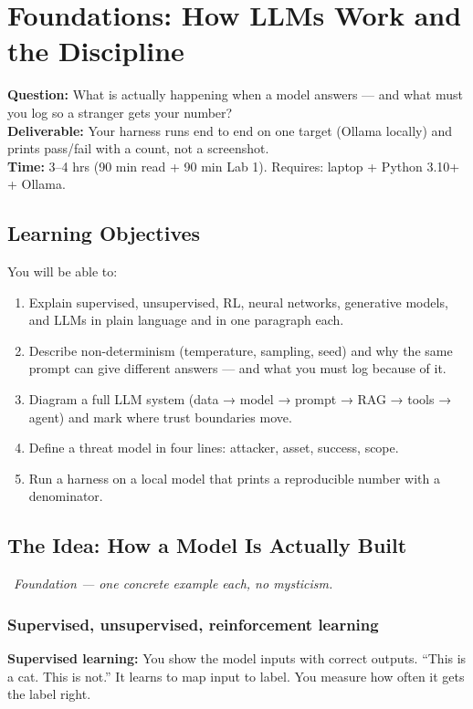 \chapter{Foundations: How LLMs Work and the Discipline}
\label{ch:1}

\begin{tcolorbox}[colback=white,colframe=checkblack,title=Chapter 1 at a Glance,fonttitle=\bfseries,sharp corners,boxrule=1pt]
\textbf{Question:} What is actually happening when a model answers — and what must you log so a stranger gets your number?\\
\textbf{Deliverable:} Your harness runs end to end on one target (Ollama locally) and prints pass/fail with a count, not a screenshot.\\
\textbf{Time:} 3–4 hrs (90 min read + 90 min Lab 1). Requires: laptop + Python 3.10+ + Ollama.
\end{tcolorbox}

\section{Learning Objectives}
\fbadge

You will be able to:
\begin{enumerate}
\item Explain supervised, unsupervised, RL, neural networks, generative models, and LLMs in plain language and in one paragraph each.
\item Describe non-determinism (temperature, sampling, seed) and why the same prompt can give different answers — and what you must log because of it.
\item Diagram a full LLM system (data → model → prompt → RAG → tools → agent) and mark where trust boundaries move.
\item Define a threat model in four lines: attacker, asset, success, scope.
\item Run a harness on a local model that prints a reproducible number with a denominator.
\end{enumerate}

\section{The Idea: How a Model Is Actually Built}
\tierF\ \textit{Foundation — one concrete example each, no mysticism.}

\subsection{Supervised, unsupervised, reinforcement learning}
\textbf{Supervised learning:} You show the model inputs with correct outputs. ``This is a cat. This is not.'' It learns to map input to label. You measure how often it gets the label right.

